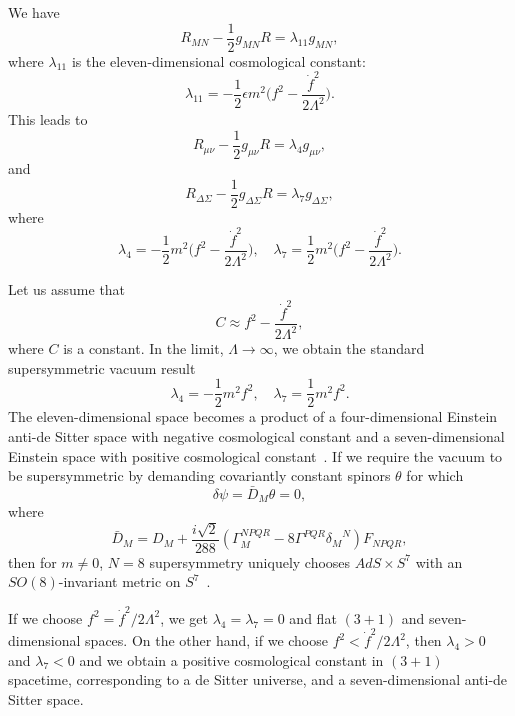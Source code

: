 \documentclass[a4paper,12pt]{article}
\begin{document}
We have
\begin{equation}
R_{MN}-\frac{1}{2}g_{MN}R=\lambda_{11} g_{MN},
\end{equation}
where $\lambda_{11}$ is the eleven-dimensional cosmological constant:
\begin{equation}
\lambda_{11}= -\frac{1}{2}\epsilon m^2\biggl(f^2-\frac{{\dot
f}^2}{2\Lambda^2}\biggr).
\end{equation}
This leads to
\begin{equation}
\label{R1} R_{\mu\nu}-\frac{1}{2}g_{\mu\nu}R=\lambda_4g_{\mu\nu},
\end{equation} and
\begin{equation}
\label{R2}
R_{\Delta\Sigma}-\frac{1}{2}g_{\Delta\Sigma}R=\lambda_7g_{\Delta\Sigma},
\end{equation}
where
\begin{equation}
\lambda_4=-\frac{1}{2}m^2\biggl(f^2-\frac{{\dot
f}^2}{2\Lambda^2}\biggr),\quad \lambda_7
=\frac{1}{2}m^2\biggl(f^2-\frac{{\dot f}^2}{2\Lambda^2}\biggr).
\end{equation}

Let us assume that
\begin{equation}
\label{Cconstant}
C\approx f^2-\frac{{\dot f}^2}{2\Lambda^2},
\end{equation}
where $C$ is a constant. In the
limit, $\Lambda\rightarrow\infty$, we obtain the standard supersymmetric
vacuum result
\begin{equation}
\lambda_4=-\frac{1}{2}m^2f^2,\quad \lambda_7=\frac{1}{2}m^2f^2.
\end{equation}
The eleven-dimensional space becomes a product of a four-dimensional
Einstein anti-de Sitter space with negative
cosmological constant and a seven-dimensional Einstein space with positive
cosmological constant~\cite{Duff}.
If we require the vacuum to be supersymmetric by
demanding covariantly constant spinors $\theta$ for which
\begin{equation}
\delta\psi={\bar D}_M\theta=0,
\end{equation}
where
\begin{equation}
{\bar D}_M=D_M+\frac{i\sqrt{2}}{288}(\Gamma^{NPQR}_M-8\Gamma^{PQR}
{\delta_M}^N)F_{NPQR},
\end{equation}
then for $m\not= 0$, $N=8$ supersymmetry uniquely chooses $AdS\times S^7$
with an $SO(8)$-invariant metric on $S^7$~\cite{Duff,Englert}.

If we choose $f^2={\dot f}^2/2\Lambda^2$, we
get $\lambda_4=\lambda_7=0$ and flat $(3+1)$ and
seven-dimensional spaces. On the other hand, if we choose
$f^2 < {\dot f^2}/2\Lambda^2$, then $\lambda_4 > 0$ and $\lambda_7 < 0$ and
we obtain a positive cosmological constant in $(3+1)$ spacetime,
corresponding to a de Sitter universe, and a seven-dimensional anti-de
Sitter space.
\end{document}
